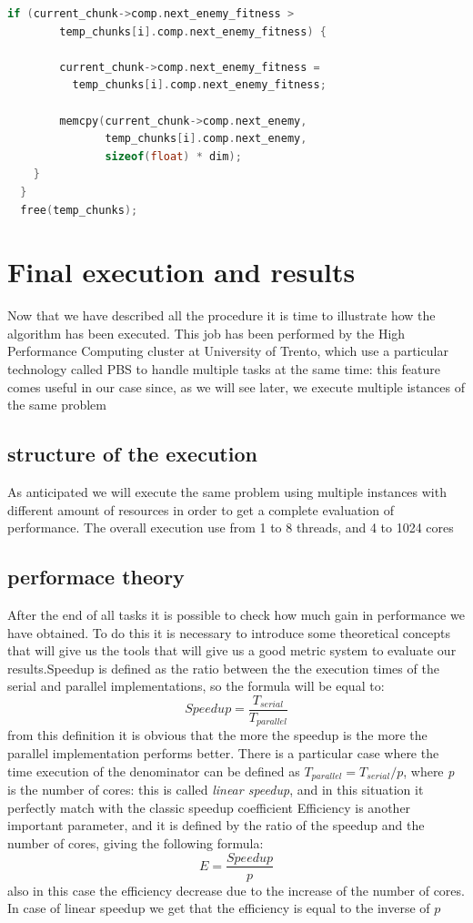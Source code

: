 \documentclass[10pt]{article}
\begin{document}
\begin{multicols}{2}
\begin{lstlisting}[language=C,caption={the parallel version of \textit{computation\_accumulate}}]
    if (current_chunk->comp.next_enemy_fitness >
        temp_chunks[i].comp.next_enemy_fitness) {

        current_chunk->comp.next_enemy_fitness =
          temp_chunks[i].comp.next_enemy_fitness;

        memcpy(current_chunk->comp.next_enemy, 
               temp_chunks[i].comp.next_enemy,
               sizeof(float) * dim);
    }
  }
  free(temp_chunks);
  \end{lstlisting}


\section{Final execution and results}
Now that we have described all the procedure it is time to illustrate how 
the algorithm has been executed. This job has been performed by the
High Performance Computing cluster at University of Trento, which 
use a particular technology called PBS to handle multiple tasks at the same
time: this feature comes useful in our case since, as we will see later, we 
execute multiple istances of the same problem
\subsection*{structure of the execution}

As anticipated we will execute the same problem using multiple instances with different amount of
resources in order to get a complete evaluation of performance. The overall execution use from 1 to 8
threads, and 4 to 1024 cores

\subsection*{performace theory}

After the end of all tasks it is possible to check how much gain in performance we have obtained.
To do this it is necessary to introduce some theoretical concepts that will give us the tools that
will give us a good metric system to evaluate our results.Speedup is defined as the ratio between the the execution times of the serial and parallel
implementations, so the formula will be equal to: $$Speedup = \frac{T_{serial}}{T_{parallel}}$$ 
from this definition it is obvious that the more the speedup is the more the parallel implementation
performs better. There is a particular case where the time execution of the denominator can be defined
as $T_{parallel}=T_{serial}/p$, where \textit{p} is the number of cores: this is called \textit{linear speedup},
and in this situation it perfectly match with the classic speedup coefficient
Efficiency is another important parameter, and it is defined by the ratio of the speedup and the 
number of cores, giving the following formula: $$E = \frac{Speedup}{p}$$
also in this case the efficiency decrease due to the increase of the number of cores. In case
of linear speedup we get that the efficiency is equal to the inverse of $p$

\end{multicols}
\end{document}
